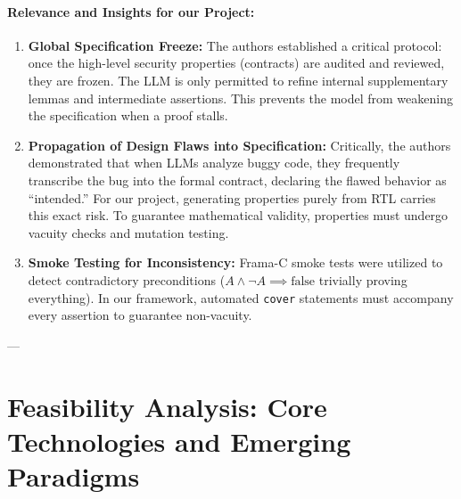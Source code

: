 \documentclass[11pt,a4paper]{article}
\begin{document}
\paragraph{Relevance and Insights for our Project:}
\begin{enumerate}
    \item \textbf{Global Specification Freeze:} The authors established a critical protocol: once the high-level security properties (contracts) are audited and reviewed, they are frozen. The LLM is only permitted to refine internal supplementary lemmas and intermediate assertions. This prevents the model from weakening the specification when a proof stalls.
    \item \textbf{Propagation of Design Flaws into Specification:} Critically, the authors demonstrated that when LLMs analyze buggy code, they frequently transcribe the bug into the formal contract, declaring the flawed behavior as ``intended.'' For our project, generating properties purely from RTL carries this exact risk. To guarantee mathematical validity, properties must undergo vacuity checks and mutation testing.
    \item \textbf{Smoke Testing for Inconsistency:} Frama-C smoke tests were utilized to detect contradictory preconditions ($A \land \neg A \implies \text{false}$ trivially proving everything). In our framework, automated \texttt{cover} statements must accompany every assertion to guarantee non-vacuity.
\end{enumerate}

---

\section{Feasibility Analysis: Core Technologies and Emerging Paradigms}
\end{document}
